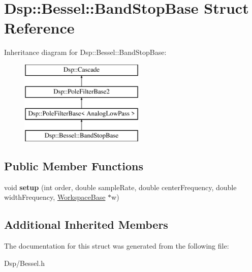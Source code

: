\hypertarget{structDsp_1_1Bessel_1_1BandStopBase}{\section{Dsp\-:\-:Bessel\-:\-:Band\-Stop\-Base Struct Reference}
\label{structDsp_1_1Bessel_1_1BandStopBase}
}
Inheritance diagram for Dsp\-:\-:Bessel\-:\-:Band\-Stop\-Base\-:\begin{figure}[H]
\begin{center}
\leavevmode
\includegraphics[height=4.000000cm]{structDsp_1_1Bessel_1_1BandStopBase}
\end{center}
\end{figure}
\subsection*{Public Member Functions}
\begin{DoxyCompactItemize}
\item 
\hypertarget{structDsp_1_1Bessel_1_1BandStopBase_ad0ed1aee533d0189053e7e505f494927}{void {\bfseries setup} (int order, double sample\-Rate, double center\-Frequency, double width\-Frequency, \hyperlink{structDsp_1_1Bessel_1_1WorkspaceBase}{Workspace\-Base} $\ast$w)}\label{structDsp_1_1Bessel_1_1BandStopBase_ad0ed1aee533d0189053e7e505f494927}

\end{DoxyCompactItemize}
\subsection*{Additional Inherited Members}


The documentation for this struct was generated from the following file\-:\begin{DoxyCompactItemize}
\item 
Dsp/Bessel.\-h\end{DoxyCompactItemize}
